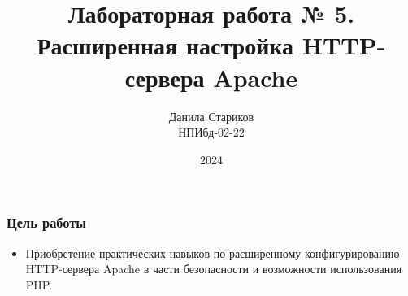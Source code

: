 

\title{Лабораторная работа № 5. \\ Расширенная настройка HTTP-сервера Apache}
\author{Данила Стариков \\ НПИбд-02-22}
\date{2024}



\frame{\titlepage}

\begin{frame}
\frametitle{Цель работы}
\begin{itemize}
    \item Приобретение практических навыков по расширенному конфигурированию HTTP-сервера Apache в части безопасности и возможности использования PHP.
\end{itemize}
\end{frame}

